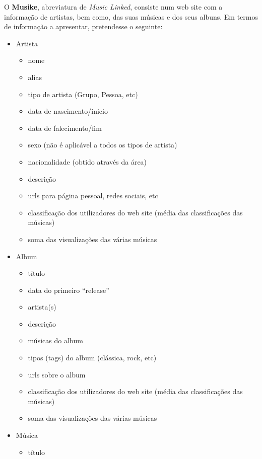\documentclass{article}
\begin{document}
O \textbf{Musike}, abreviatura de \textit{Music Linked}, consiste num web site com a informação de artistas, bem como, das suas músicas e dos seus albuns. Em termos de informação a apresentar, pretendesse o seguinte:
\begin{itemize}
    \item Artista
        \begin{itemize}
            \item nome
            \item alias
            \item tipo de artista (Grupo, Pessoa, etc)
            \item data de nascimento/inicio
            \item data de falecimento/fim
            \item sexo (não é aplicável a todos os tipos de artista)
            \item nacionalidade (obtido através da área)
            \item descrição
            \item urls para página pessoal, redes sociais, etc
            \item classificação dos utilizadores do web site (média das classificações das músicas)
            \item soma das visualizações das várias músicas
        \end{itemize}
    \item Album
        \begin{itemize}
            \item título
            \item data do primeiro ``release''
            \item artista(s)
            \item descrição
            \item músicas do album
            \item tipos (tags) do album (clássica, rock, etc)
            \item urls sobre o album
            \item classificação dos utilizadores do web site (média das classificações das músicas)
            \item soma das visualizações das várias músicas
        \end{itemize}
    \item Música
        \begin{itemize}
            \item título

\end{itemize}
\end{itemize}
\end{document}
